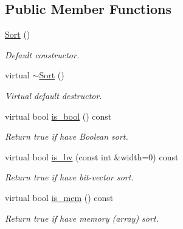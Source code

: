 \subsection*{Public Member Functions}
\begin{DoxyCompactItemize}
\item 
\mbox{\label{classilang_1_1_sort_a9073ce0d29a535949387aebbbea2a10c}} 
\mbox{\hyperlink{classilang_1_1_sort_a9073ce0d29a535949387aebbbea2a10c}{Sort}} ()
\begin{DoxyCompactList}\small\item\em Default constructor. \end{DoxyCompactList}\item 
\mbox{\label{classilang_1_1_sort_a91e8360e60a137ea439353a9edd0917a}} 
virtual \mbox{\hyperlink{classilang_1_1_sort_a91e8360e60a137ea439353a9edd0917a}{$\sim$\+Sort}} ()
\begin{DoxyCompactList}\small\item\em Virtual default destructor. \end{DoxyCompactList}\item 
\mbox{\label{classilang_1_1_sort_a84919df08dd02bbb47dcb169231fb2cc}} 
virtual bool \mbox{\hyperlink{classilang_1_1_sort_a84919df08dd02bbb47dcb169231fb2cc}{is\+\_\+bool}} () const
\begin{DoxyCompactList}\small\item\em Return true if have Boolean sort. \end{DoxyCompactList}\item 
\mbox{\label{classilang_1_1_sort_a001f643435887b2db4592c832f824b3b}} 
virtual bool \mbox{\hyperlink{classilang_1_1_sort_a001f643435887b2db4592c832f824b3b}{is\+\_\+bv}} (const int \&width=0) const
\begin{DoxyCompactList}\small\item\em Return true if have bit-\/vector sort. \end{DoxyCompactList}\item 
\mbox{\label{classilang_1_1_sort_a7188bb5d9589c9b3590c976d4d0ff2dd}} 
virtual bool \mbox{\hyperlink{classilang_1_1_sort_a7188bb5d9589c9b3590c976d4d0ff2dd}{is\+\_\+mem}} () const
\begin{DoxyCompactList}\small\item\em Return true if have memory (array) sort. \end{DoxyCompactList}\item 

\end{DoxyCompactItemize}
